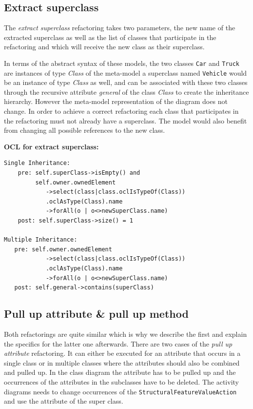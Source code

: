 \documentclass{llncs}
\begin{document}
\subsection{Extract superclass}
\label{sec:extract}
The \textit{extract superclass} refactoring takes two parameters, the new name of the extracted superclass as well as
the list of classes that participate in the refactoring and which will receive the new class as their superclass.

In terms of the abstract syntax of these models, the two classes \lstinline|Car| and \lstinline|Truck| are instances of 
type \textit{Class} of the meta-model a superclass named \lstinline|Vehicle| would be an instance of type \textit{Class} as well, 
and can be associated with these two classes through the recursive attribute \textit{general} of the class \textit{Class} 
to create the inheritance hierarchy. However the meta-model representation of the diagram does not change. In order to 
achieve a correct refactoring each class that participates in the refactoring must not already have a superclass. The 
model would also benefit from changing all possible references to the new class.

\textbf{OCL for extract superclass:}
\begin{lstlisting}
Single Inheritance:
    pre: self.superClass->isEmpty() and 
         self.owner.ownedElement
            ->select(class|class.oclIsTypeOf(Class))
            .oclAsType(Class).name
            ->forAll(o | o<>newSuperClass.name)
    post: self.superClass->size() = 1

Multiple Inheritance:
   pre: self.owner.ownedElement
            ->select(class|class.oclIsTypeOf(Class))
            .oclAsType(Class).name
            ->forAll(o | o<>newSuperClass.name)
   post: self.general->contains(superClass)
\end{lstlisting}

\subsection{Pull up attribute \& pull up method}
\label{sec:pullup}
Both refactorings are quite similar which is why we describe the first and explain the specifics for the latter one afterwards. 
There are two cases of the \textit{pull up attribute} refactoring. It can either be executed for an attribute that occurs in 
a single class or in multiple classes where the attributes should also be combined and pulled up. In the class diagram 
the attribute has to be pulled up and the occurrences of the attributes in the subclasses have to be deleted. The 
activity diagrams needs to change occurrences of the \lstinline|StructuralFeatureValueAction| and use the attribute of 
the super class.
\end{document}
